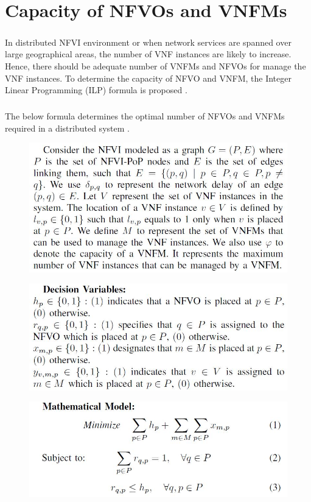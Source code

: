\chapter{Capacity of NFVOs and VNFMs}
\label{ch:Capacity of NFVOs and VNFMs}

\paragraph{}In distributed NFVI environment or when network services are spanned over large geographical areas, the number of VNF instances are likely to increase. Hence, there should be adequate number of VNFMs and NFVOs for manage the VNF instances. To determine the capacity of NFVO and VNFM, the Integer Linear Programming (ILP) formula is proposed \cite{abu2017nfv}.

\paragraph{}The below formula determines the optimal number of NFVOs and VNFMs required in a distributed system \cite{abu2017nfv}.

\begin{figure} [H]
	\centering
	\includegraphics[width=0.6\linewidth]{"figures/system model"}
	{\caption*{}}
	\label{}
\end{figure}

\begin{figure}[H]
	\centering
	\includegraphics[width=0.7\linewidth]{"figures/Decision variables"}
	{\caption*{}}
	\label{}
\end{figure}

\begin{figure} [H]
	\centering
	\includegraphics[width=0.7\linewidth]{"figures/math model 1"}
	{\caption*{}}
	\label{}
\end{figure}

